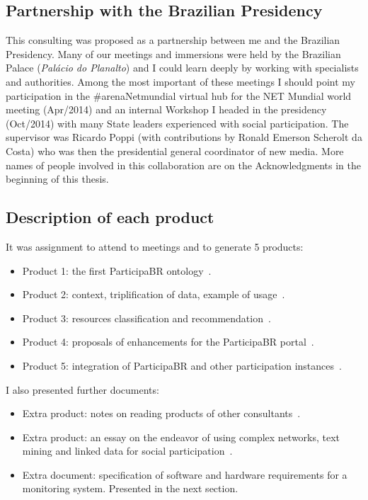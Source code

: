 \begin{apendicesenv}
\subsection{Partnership with the Brazilian Presidency}
This consulting was proposed as a partnership between me
and the Brazilian Presidency.
Many of our meetings and immersions were held by the Brazilian Palace (\emph{Palácio do Planalto})
and I could learn deeply by working with specialists and authorities.
Among the most important of these meetings I should point
my participation in the \#arenaNetmundial virtual hub for the NET Mundial world meeting (Apr/2014)
and an internal Workshop I headed in the presidency (Oct/2014) with many State leaders experienced with social participation.
The supervisor was Ricardo Poppi (with contributions by Ronald Emerson Scherolt da Costa)
who was then the presidential general coordinator of new media.
More names of people involved in this collaboration are on the Acknowledgments in the beginning of this thesis.

\subsection{Description of each product}
It was assignment to attend to meetings and to generate 5 products:
\begin{itemize}
	\item Product 1: the first ParticipaBR ontology~\cite{opa0}.
	\item Product 2: context, triplification of data, example of usage~\cite{pnud2}.
	\item Product 3: resources classification and recommendation~\cite{pnud3}.
	\item Product 4: proposals of enhancements for the ParticipaBR portal~\cite{pnud4}.
	\item Product 5: integration of ParticipaBR and other participation instances~\cite{opa}.
\end{itemize}

I also presented further documents:
\begin{itemize}
	\item Extra product: notes on reading products of other consultants~\cite{pnudExtra}.
	\item Extra product: an essay on the endeavor of using complex networks, text mining and linked data for social participation~\cite{ensaio}.
	\item Extra document: specification of software and hardware requirements for a monitoring system. Presented in the next section.
\end{itemize}


\end{apendicesenv}
